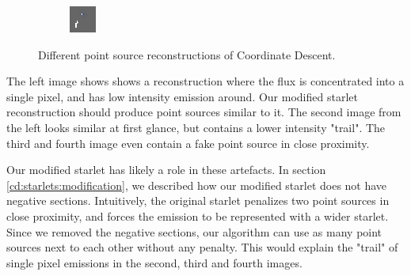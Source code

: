 \begin{figure}[h]
\begin{subfigure}[b]{0.2\linewidth}
	\end{subfigure}
	\begin{subfigure}[b]{0.2\linewidth}
		\includegraphics[width=\linewidth]{./chapters/20.results/mixed/problems/point3.png}
	\end{subfigure}
	\caption{Different point source reconstructions of Coordinate Descent.}
	\label{results:mixed:points}
\end{figure}

The left image shows shows a reconstruction where the flux is concentrated into a single pixel, and has low intensity emission around. Our modified starlet reconstruction should produce point sources similar to it. The second image from the left looks similar at first glance, but contains a lower intensity "trail". The third and fourth image even contain a fake point source in close proximity.

Our modified starlet has likely a role in these artefacts. In section \ref{cd:starlets:modification}, we described how our modified starlet does not have negative sections. Intuitively, the original starlet penalizes two point sources in close proximity, and forces the emission to be represented with a wider starlet. Since we removed the negative sections, our algorithm can use as many point sources next to each other without any penalty. This would explain the "trail" of single pixel emissions in the second, third and fourth images.

